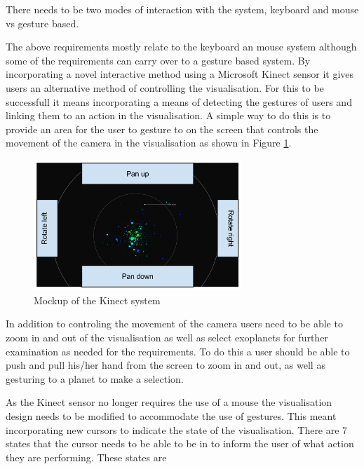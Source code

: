 \begin{enumerate}
\clearpage
{\bf  \item[R8.] There needs to be two modes of interaction with the system,
keyboard and mouse vs gesture based.}

The above requirements mostly relate to the keyboard an mouse system although
some of the requirements can carry over to a gesture based system. By
incorporating a novel interactive method using a Microsoft Kinect sensor it
gives users an alternative method of controlling the visualisation. For this to
be successfull it means incorporating a
means of detecting the gestures of users and linking them to an action in the
visualisation. A simple way to do this is to provide an area for the user to
gesture to on the screen that controls the movement of the camera in the
visualisation as shown in Figure \ref{fig:kinectMock}.
\begin{figure}[H]
  \centering
      \includegraphics[width=0.7\textwidth]{images/mockKinect.png}
  \caption{Mockup of the Kinect system}
  \label{fig:kinectMock}
\end{figure}

In addition to controling the movement of the camera users need to be able to
zoom in and out of the visualisation as well as select exoplanets for further
examination as needed for the requirements. To do this a user should be able to
push and pull his/her hand from the screen to zoom in and out, as well as
gesturing to a planet to make a selection.

As the Kinect sensor no longer requires the use of a mouse the visualisation
design needs to be modified to accommodate the use of gestures. This meant
incorporating new cursors to indicate the state of the visualisation.
There are 7 states that the cursor needs to be able to be in to inform the user
of what action they are performing. These states are


\end{enumerate}
